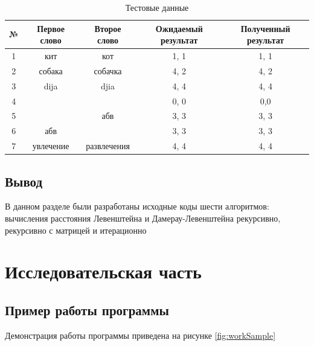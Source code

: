 \documentclass[12pt]{report}
\begin{document}
    \begin{table}[H]
        \centering
        \caption{Тестовые данные}
        \label{tab:tests}
        \begin{tabular}{|c c c c c|}
            \hline
            № & Первое слово & Второе слово & Ожидаемый результат & Полученный результат \\ [0.8ex]
            \hline
            1 & кит          & кот         & 1, 1                & 1, 1                 \\
            \hline
            2 & собака       & собачка     & 4, 2                & 4, 2                 \\
            \hline
            3 & dija         & djia         & 4, 4                & 4, 4                 \\
            \hline
            4 &              &              & 0, 0                & 0,0                  \\
            \hline
            5 &              & абв          & 3, 3                & 3, 3                 \\
            \hline
            6 & абв          &              & 3, 3                & 3, 3                 \\
            \hline
            7 & увлечение        & развлечения        & 4, 4                & 4, 4                 \\
            \hline
        \end{tabular}
    \end{table}


    \section{Вывод}
    В данном разделе были разработаны исходные коды шести алгоритмов: вычисления расстояния
    Левенштейна и Дамерау-Левенштейна рекурсивно, рекурсивно с матрицей и итерационно


    \chapter{Исследовательская часть}



    \section{Пример работы программы}
    Демонстрация работы программы приведена на рисунке \ref{fig:workSample}
\end{document}
